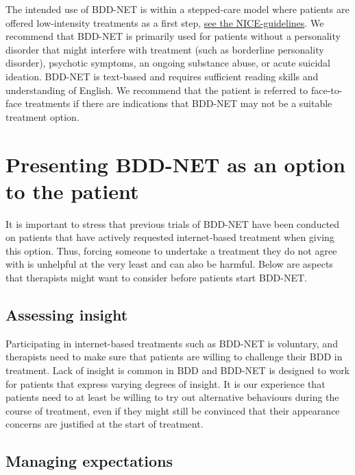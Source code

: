 \documentclass[]{book}
\theoremstyle{definition}
\theoremstyle{definition}
\theoremstyle{definition}
\theoremstyle{remark}
\begin{document}
The intended use of BDD-NET is within a stepped-care model where
patients are offered low-intensity treatments as a first step,
\href{https://www.nice.org.uk/guidance/CG31/chapter/1-Guidance\#stepped-care-for-adults-young-people-and-children-with-ocd-or-bdd}{see
the NICE-guidelines}. We recommend that BDD-NET is primarily used for
patients without a personality disorder that might interfere with
treatment (such as borderline personality disorder), psychotic symptoms,
an ongoing substance abuse, or acute suicidal ideation. BDD-NET is
text-based and requires sufficient reading skills and understanding of
English. We recommend that the patient is referred to face-to-face
treatments if there are indications that BDD-NET may not be a suitable
treatment option.

\hypertarget{presenting-bdd-net-as-an-option-to-the-patient}{%
\section{Presenting BDD-NET as an option to the
patient}\label{presenting-bdd-net-as-an-option-to-the-patient}}

It is important to stress that previous trials of BDD-NET have been
conducted on patients that have actively requested internet-based
treatment when giving this option. Thus, forcing someone to undertake a
treatment they do not agree with is unhelpful at the very least and can
also be harmful. Below are aspects that therapists might want to
consider before patients start BDD-NET.

\hypertarget{assessing-insight}{%
\subsection{Assessing insight}\label{assessing-insight}}

Participating in internet-based treatments such as BDD-NET is voluntary,
and therapists need to make sure that patients are willing to challenge
their BDD in treatment. Lack of insight is common in BDD and BDD-NET is
designed to work for patients that express varying degrees of insight.
It is our experience that patients need to at least be willing to try
out alternative behaviours during the course of treatment, even if they
might still be convinced that their appearance concerns are justified at
the start of treatment.

\hypertarget{managing-expectations}{%
\subsection{Managing expectations}\label{managing-expectations}}
\end{document}
